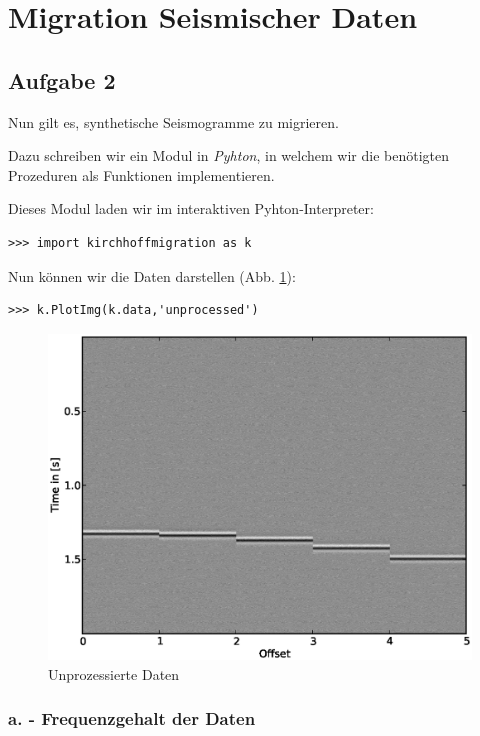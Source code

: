 \documentclass[12pt,a4paper]{scrartcl}
\begin{document}
\section*{Migration Seismischer Daten}

\subsection*{Aufgabe 2}


Nun gilt es, synthetische Seismogramme zu migrieren.

Dazu schreiben wir ein Modul in \textit{Pyhton}, in welchem wir die benötigten Prozeduren als Funktionen implementieren.

Dieses Modul laden wir im interaktiven Pyhton-Interpreter:

\begin{verbatim}
>>> import kirchhoffmigration as k
\end{verbatim}

Nun können wir die Daten darstellen (Abb. \ref{unprocessed}):

\begin{verbatim}
>>> k.PlotImg(k.data,'unprocessed')
\end{verbatim}

\begin{figure}[htb]
\centering
\includegraphics[width=1\textwidth]{unprocessed}
\caption{Unprozessierte Daten}
\label{unprocessed}
\end{figure}

\subsubsection*{a. - Frequenzgehalt der Daten}
\end{document}
